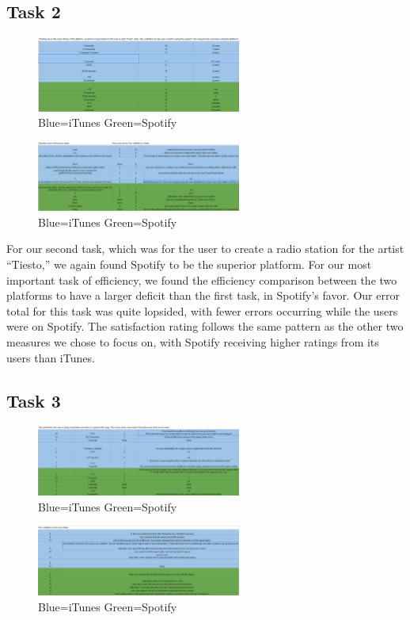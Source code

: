 \documentclass[a4paper]{article}
\begin{document}
\subsection{Task 2}

\begin{figure}[H]
\centering
\includegraphics[width=0.6\textwidth]{task2_1.PNG}
\caption{\label{task:task2.1}Blue=iTunes  Green=Spotify}
\end{figure}
\begin{figure}[H]
\centering
\includegraphics[width=0.6\textwidth]{task2_2.PNG}
\caption{\label{task:task2.2}Blue=iTunes  Green=Spotify}
\end{figure}

For our second task, which was for the user to create a radio station for the artist ``Tiesto,'' we again found Spotify to be the superior platform. For our most important task of efficiency, we found the efficiency comparison between the two platforms to have a larger deficit than the first task, in Spotify's favor. Our error total for this task was quite lopsided, with fewer errors occurring while the users were on Spotify. The satisfaction rating follows the same pattern as the other two measures we chose to focus on, with Spotify receiving higher ratings from its users than iTunes.


\subsection{Task 3}

\begin{figure}[H]
\centering
\includegraphics[width=0.6\textwidth]{task3_1.PNG}
\caption{\label{task:task3.1}Blue=iTunes  Green=Spotify}
\end{figure}
\begin{figure}[H]
\centering
\includegraphics[width=0.6\textwidth]{task3_2.PNG}
\caption{\label{task:task3.2}Blue=iTunes  Green=Spotify}
\end{figure}
\end{document}
